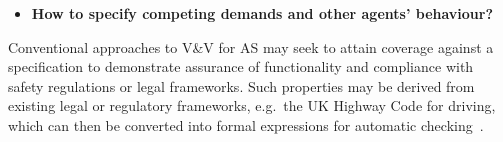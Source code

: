 \documentclass[sigconf,nonacm]{acmart}%
\begin{document}
	
	
	\begin{itemize}[leftmargin=0.5cm]
		\item \textbf{How to specify competing demands and other agents' behaviour?}
	\end{itemize}
	Conventional approaches to V\&V for AS may seek to attain coverage against a specification to demonstrate assurance of functionality and compliance with safety regulations or legal frameworks. 
	Such properties may be derived from existing legal or regulatory frameworks, e.g.\ the UK Highway Code for driving, which can then be converted into formal expressions for automatic checking~\cite{harper2021safety}.
	
\end{document}
